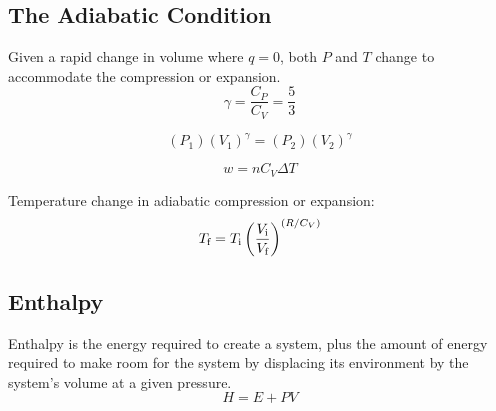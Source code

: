 \documentclass[10pt]{article}
\begin{document}

\subsection{The Adiabatic Condition}

Given a rapid change in volume where $q=0$, both $P$ and $T$ change to accommodate the compression or expansion.
\begin{equation*}
\gamma = \frac{C_P}{C_V} = \frac{5}{3}
\end{equation*}

\begin{equation*}
(P_1)(V_1)^\gamma = (P_2)(V_2)^\gamma
\end{equation*}

\begin{equation*}
w = nC_V\Delta T
\end{equation*}

Temperature change in adiabatic compression or expansion:
\begin{equation*}
T_\textnormal{f} = T_\textnormal{i}\left(\frac{V_\textnormal{i}}{V_\textnormal{f}}\right)^{(R/C_V)}
\end{equation*}



\vspace*{0.5cm}
\subsection{Enthalpy}

Enthalpy is the energy required to create a system, plus the amount of energy required to make room for the system by displacing its environment by the system's volume at a given pressure.
\begin{equation*}
H = E + PV
\end{equation*}
\end{document}
